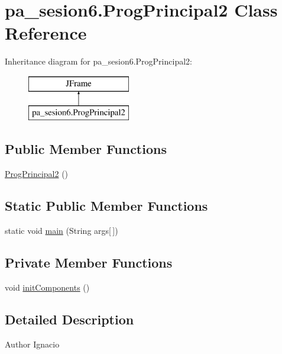 \hypertarget{classpa__sesion6_1_1_prog_principal2}{}\section{pa\+\_\+sesion6.\+Prog\+Principal2 Class Reference}
\label{classpa__sesion6_1_1_prog_principal2}
Inheritance diagram for pa\+\_\+sesion6.\+Prog\+Principal2\+:\begin{figure}[H]
\begin{center}
\leavevmode
\includegraphics[height=2.000000cm]{classpa__sesion6_1_1_prog_principal2}
\end{center}
\end{figure}
\subsection*{Public Member Functions}
\begin{DoxyCompactItemize}
\item 
\mbox{\hyperlink{classpa__sesion6_1_1_prog_principal2_a1aed9d29f7195e51e8a0ab08f0165981}{Prog\+Principal2}} ()
\end{DoxyCompactItemize}
\subsection*{Static Public Member Functions}
\begin{DoxyCompactItemize}
\item 
static void \mbox{\hyperlink{classpa__sesion6_1_1_prog_principal2_a28021247d5b28b8ef35c9f89dadbc6d3}{main}} (String args\mbox{[}$\,$\mbox{]})
\end{DoxyCompactItemize}
\subsection*{Private Member Functions}
\begin{DoxyCompactItemize}
\item 
void \mbox{\hyperlink{classpa__sesion6_1_1_prog_principal2_aad9c52c49c917b5381a0fbd3bd0fc391}{init\+Components}} ()
\end{DoxyCompactItemize}


\subsection{Detailed Description}
\begin{DoxyAuthor}{Author}
Ignacio 
\end{DoxyAuthor}


